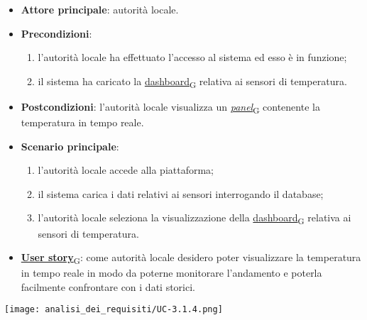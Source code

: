 \begin{itemize}
	\item \textbf{Attore principale}: autorità locale.
	\item \textbf{Precondizioni}:
	      \begin{enumerate}
		      \item l'autorità locale ha effettuato l'accesso al sistema ed esso è in funzione;
		      \item il sistema ha caricato la \href{https://7last.github.io/docs/pb/documentazione-interna/glossario\#dashboard}{dashboard\textsubscript{G}} relativa ai sensori di temperatura.
	      \end{enumerate}
	\item \textbf{Postcondizioni}: l'autorità locale visualizza un \href{https://7last.github.io/docs/pb/documentazione-interna/glossario\#panel}{\textit{panel}\textsubscript{G}} contenente la temperatura in tempo reale.
	\item \textbf{Scenario principale}:
	      \begin{enumerate}
		      \item l'autorità locale accede alla piattaforma;
		      \item il sistema carica i dati relativi ai sensori interrogando il database;
		      \item l'autorità locale seleziona la visualizzazione della \href{https://7last.github.io/docs/pb/documentazione-interna/glossario\#dashboard}{dashboard\textsubscript{G}} relativa ai sensori di temperatura.
	      \end{enumerate}
	\item \href{https://7last.github.io/docs/pb/documentazione-interna/glossario\#user-story}{\textbf{User story}\textsubscript{G}}:
	      come autorità locale desidero poter visualizzare la temperatura in tempo reale in modo da poterne monitorare l'andamento
	      e poterla facilmente confrontare con i dati storici.
\end{itemize}
\begin{center}
	\texttt{[image: analisi\_dei\_requisiti/UC-3.1.4.png]}
\end{center}


